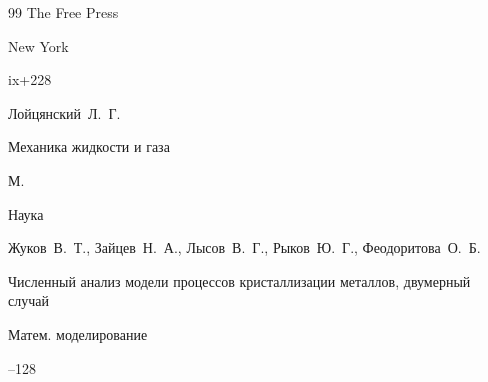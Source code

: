 \begin{thebibliography}{99}
\publ The Free Press

\publaddr New York 


\totalpages ix+228













\by Лойцянский~Л.~Г.

\book Механика жидкости и газа

\publaddr М.

\publ Наука














\by Жуков~В.~Т., Зайцев~Н.~А., Лысов~В.~Г., Рыков~Ю.~Г., Феодоритова~О.~Б.

\paper Численный анализ модели процессов кристаллизации металлов, двумерный случай

\jour Матем. моделирование




--128











\end{thebibliography}
